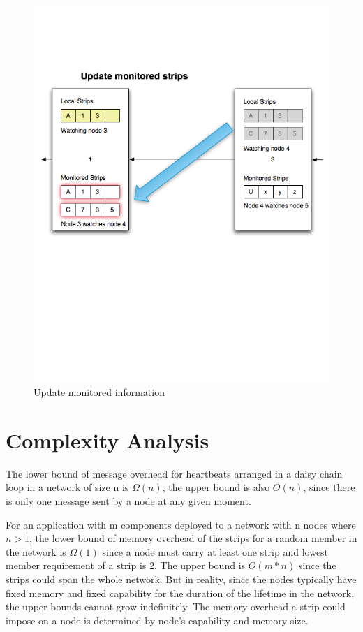 \begin{figure}[h!]
\centering
    \includegraphics[width=\linewidth]{figures/strip10}
\caption{Update monitored information}
\label{fig:strip10}
\end{figure}

\section{Complexity Analysis}

The lower bound of message overhead for heartbeats arranged in a daisy chain
loop in a network of size n is $\Omega(n)$, the upper bound is also $O(n)$, since
there is only one message sent by a node at any given moment.

For an application with m components deployed to a network with n nodes where
$n > 1$, the lower bound of memory overhead of the strips for a random member in
the network is $\Omega(1)$ since a node must carry at least one strip and lowest
member requirement of a strip is 2. The upper bound is $O(m*n)$ since the strips
could span the whole network. But in reality, since the nodes typically have
fixed memory and fixed capability for the duration of the lifetime in the
network, the upper bounds cannot grow indefinitely. The memory overhead a strip
could impose on a node is determined by node's capability and memory size.


